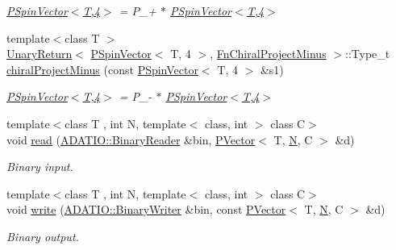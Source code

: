 \begin{DoxyCompactItemize}
\begin{DoxyCompactList}\small\item\em \mbox{\hyperlink{classENSEM_1_1PSpinVector_3_01T_00_014_01_4}{P\+Spin\+Vector$<$\+T,4$>$}} = P\+\_\++ $\ast$ \mbox{\hyperlink{classENSEM_1_1PSpinVector_3_01T_00_014_01_4}{P\+Spin\+Vector$<$\+T,4$>$}} \end{DoxyCompactList}\item 
{\footnotesize template$<$class T $>$ }\\\mbox{\hyperlink{structENSEM_1_1UnaryReturn}{Unary\+Return}}$<$ \mbox{\hyperlink{classENSEM_1_1PSpinVector}{P\+Spin\+Vector}}$<$ T, 4 $>$, \mbox{\hyperlink{structENSEM_1_1FnChiralProjectMinus}{Fn\+Chiral\+Project\+Minus}} $>$\+::Type\+\_\+t \mbox{\hyperlink{group__primspinvector_ga7af53ea534552edc873a7cb1f52a94e1}{chiral\+Project\+Minus}} (const \mbox{\hyperlink{classENSEM_1_1PSpinVector}{P\+Spin\+Vector}}$<$ T, 4 $>$ \&s1)
\begin{DoxyCompactList}\small\item\em \mbox{\hyperlink{classENSEM_1_1PSpinVector_3_01T_00_014_01_4}{P\+Spin\+Vector$<$\+T,4$>$}} = P\+\_\+-\/ $\ast$ \mbox{\hyperlink{classENSEM_1_1PSpinVector_3_01T_00_014_01_4}{P\+Spin\+Vector$<$\+T,4$>$}} \end{DoxyCompactList}\item 
{\footnotesize template$<$class T , int N, template$<$ class, int $>$ class C$>$ }\\void \mbox{\hyperlink{group__primvector_ga7490c5f7d1484d1500da031d977a1217}{read}} (\mbox{\hyperlink{classADATIO_1_1BinaryReader}{A\+D\+A\+T\+I\+O\+::\+Binary\+Reader}} \&bin, \mbox{\hyperlink{classENSEM_1_1PVector}{P\+Vector}}$<$ T, \mbox{\hyperlink{operator__name__util_8cc_a7722c8ecbb62d99aee7ce68b1752f337}{N}}, C $>$ \&d)
\begin{DoxyCompactList}\small\item\em Binary input. \end{DoxyCompactList}\item 
{\footnotesize template$<$class T , int N, template$<$ class, int $>$ class C$>$ }\\void \mbox{\hyperlink{group__primvector_ga06b3a608b1c1724f947b9a83bb506880}{write}} (\mbox{\hyperlink{classADATIO_1_1BinaryWriter}{A\+D\+A\+T\+I\+O\+::\+Binary\+Writer}} \&bin, const \mbox{\hyperlink{classENSEM_1_1PVector}{P\+Vector}}$<$ T, \mbox{\hyperlink{operator__name__util_8cc_a7722c8ecbb62d99aee7ce68b1752f337}{N}}, C $>$ \&d)
\begin{DoxyCompactList}\small\item\em Binary output. \end{DoxyCompactList}\item 

\end{DoxyCompactItemize}
